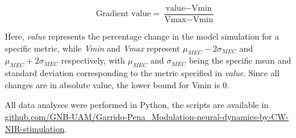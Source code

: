 \[\text{Gradient value} = \frac{\text{value} - \text{Vmin}}{\text{Vmax} - \text{Vmin}}\]

Here, \textit{value} represents the percentage change in the model simulation for a specific metric, while \textit{Vmin} and \textit{Vmax} represent $\mu_{MEC}-2\sigma_{MEC}$ and $\mu_{MEC}+2\sigma_{MEC}$ respectively, with $\mu_{MEC}$ and $\sigma_{MEC}$ being the specific mean and standard deviation corresponding to the metric specified in \textit{value}. Since all changes are in absolute value, the lower bound for Vmin is 0.

All data analyses were performed in Python, the scripts are available in \href{https://github.com/GNB-UAM/Garrido-Pena_Modulation-neural-dynamics-by-CW-NIR-stimulation}{github.com/GNB-UAM/Garrido-Pena\_Modulation-neural-dynamics-by-CW-NIR-stimulation}.
